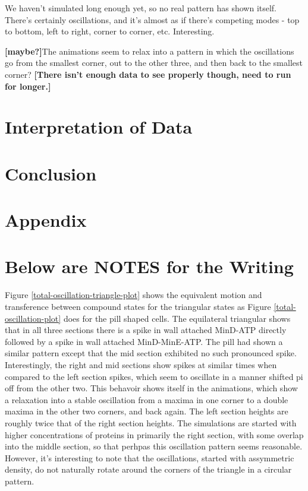 \documentclass[letterpaper,twocolumn,amsmath,amssymb,pre]{revtex4-1}
\newcommand{\red}[1]{{\bf \color{red} #1}}
\newcommand{\fixme}[1]{\red{[#1]}}
\begin{document}
We haven't simulated long enough yet, so no real pattern has shown
itself.  There's certainly oscillations, and it's almost as if there's
competing modes - top to bottom, left to right, corner to corner, etc.
Interesting.

\fixme{maybe?}The animations seem to relax into a pattern in which the oscillations
go from the smallest corner, out to the other three, and then back to
the smallest corner?  \fixme{There isn't enough data to see properly
  though, need to run for longer.}


\section{Interpretation of Data}
\section{Conclusion}
\section*{Appendix}







\section{Below are NOTES for the Writing}

Figure \ref{total-oscillation-triangle-plot} shows the equivalent
motion and transference between compound states for the triangular
states as Figure \ref{total-oscillation-plot} does for the pill shaped
cells.  The equilateral triangular shows that in all three sections
there is a spike in wall attached MinD-ATP directly followed by a
spike in wall attached MinD-MinE-ATP.  The pill had shown a similar
pattern except that the mid section exhibited no such pronounced
spike.  Interestingly, the right and mid sections show spikes at
similar times when compared to the left section spikes, which seem to
oscillate in a manner shifted pi off from the other two.  This
behavoir shows itself in the animations, which show a relaxation into
a stable oscillation from a maxima in one corner to a double maxima in
the other two corners, and back again.  The left section heights are
roughly twice that of the right section heights.  The simulations are
started with higher concentrations of proteins in primarily the right
section, with some overlap into the middle section, so that perhpas
this oscillation pattern seems reasonable.  However, it's interesting
to note that the oscillations, started with assymmetric density, do
not naturally rotate around the corners of the triangle in a circular
pattern.
\end{document}
